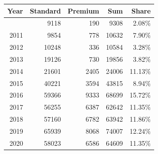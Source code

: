 \begin{table}[!t]
\fontsize{12.0pt}{14.4pt}\selectfont
\begin{tabular*}{\linewidth}{@{\extracolsep{\fill}}rrrrr}
\toprule
Year & Standard & Premium & Sum & Share \\ 
\midrule\addlinespace[2.5pt]
2010 & 9118 & 190 & 9308 & 2.08\% \\ 
2011 & 9854 & 778 & 10632 & 7.90\% \\ 
2012 & 10248 & 336 & 10584 & 3.28\% \\ 
2013 & 19126 & 730 & 19856 & 3.82\% \\ 
2014 & 21601 & 2405 & 24006 & 11.13\% \\ 
2015 & 40221 & 3594 & 43815 & 8.94\% \\ 
2016 & 59366 & 9333 & 68699 & 15.72\% \\ 
2017 & 56255 & 6387 & 62642 & 11.35\% \\ 
2018 & 57160 & 6782 & 63942 & 11.86\% \\ 
2019 & 65939 & 8068 & 74007 & 12.24\% \\ 
2020 & 58023 & 6586 & 64609 & 11.35\% \\ 
\bottomrule
\end{tabular*}
\end{table}

